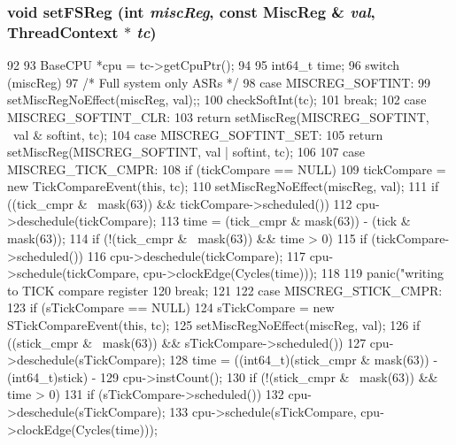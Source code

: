 \hypertarget{classSparcISA_1_1ISA_af746bd351f28656415fa83508c51f99d}{
\subsubsection[{setFSReg}]{\setlength{\rightskip}{0pt plus 5cm}void setFSReg (int {\em miscReg}, \/  const {\bf MiscReg} \& {\em val}, \/  {\bf ThreadContext} $\ast$ {\em tc})}}
\label{classSparcISA_1_1ISA_af746bd351f28656415fa83508c51f99d}



\begin{DoxyCode}
92 {
93     BaseCPU *cpu = tc->getCpuPtr();
94 
95     int64_t time;
96     switch (miscReg) {
97         /* Full system only ASRs */
98       case MISCREG_SOFTINT:
99         setMiscRegNoEffect(miscReg, val);;
100         checkSoftInt(tc);
101         break;
102       case MISCREG_SOFTINT_CLR:
103         return setMiscReg(MISCREG_SOFTINT, ~val & softint, tc);
104       case MISCREG_SOFTINT_SET:
105         return setMiscReg(MISCREG_SOFTINT, val | softint, tc);
106 
107       case MISCREG_TICK_CMPR:
108         if (tickCompare == NULL)
109             tickCompare = new TickCompareEvent(this, tc);
110         setMiscRegNoEffect(miscReg, val);
111         if ((tick_cmpr & ~mask(63)) && tickCompare->scheduled())
112             cpu->deschedule(tickCompare);
113         time = (tick_cmpr & mask(63)) - (tick & mask(63));
114         if (!(tick_cmpr & ~mask(63)) && time > 0) {
115             if (tickCompare->scheduled())
116                 cpu->deschedule(tickCompare);
117             cpu->schedule(tickCompare, cpu->clockEdge(Cycles(time)));
118         }
119         panic("writing to TICK compare register %
120         break;
121 
122       case MISCREG_STICK_CMPR:
123         if (sTickCompare == NULL)
124             sTickCompare = new STickCompareEvent(this, tc);
125         setMiscRegNoEffect(miscReg, val);
126         if ((stick_cmpr & ~mask(63)) && sTickCompare->scheduled())
127             cpu->deschedule(sTickCompare);
128         time = ((int64_t)(stick_cmpr & mask(63)) - (int64_t)stick) -
129             cpu->instCount();
130         if (!(stick_cmpr & ~mask(63)) && time > 0) {
131             if (sTickCompare->scheduled())
132                 cpu->deschedule(sTickCompare);
133             cpu->schedule(sTickCompare, cpu->clockEdge(Cycles(time)));
}}}
\end{DoxyCode}
